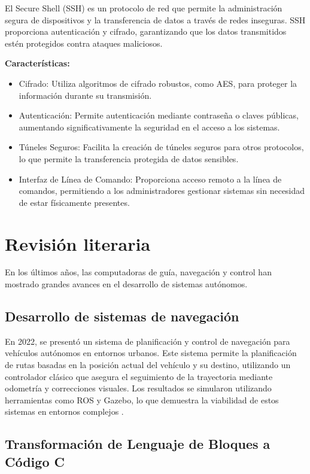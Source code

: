El Secure Shell (SSH) es un protocolo de red que permite la administración segura de dispositivos y la transferencia de datos a través de redes inseguras. SSH proporciona autenticación y cifrado, garantizando que los datos transmitidos estén protegidos contra ataques maliciosos.

\textbf{Características:}

\begin{itemize}
    \item Cifrado: Utiliza algoritmos de cifrado robustos, como AES, para proteger la información durante su transmisión.
    \item Autenticación: Permite autenticación mediante contraseña o claves públicas, aumentando significativamente la seguridad en el acceso a los sistemas.
    \item Túneles Seguros: Facilita la creación de túneles seguros para otros protocolos, lo que permite la transferencia protegida de datos sensibles.
    \item Interfaz de Línea de Comando: Proporciona acceso remoto a la línea de comandos, permitiendo a los administradores gestionar sistemas sin necesidad de estar físicamente presentes.
\end{itemize}

\section{Revisión literaria}
En los últimos años, las computadoras de guía, navegación y control han mostrado grandes avances en el desarrollo de sistemas autónomos.

\subsection{Desarrollo de sistemas de navegación}

En 2022, se presentó un sistema de planificación y control de navegación para vehículos autónomos en entornos urbanos. Este sistema permite la planificación 
de rutas basadas en la posición actual del vehículo y su destino, utilizando un controlador clásico que asegura el seguimiento de la trayectoria mediante 
odometría y correcciones visuales. Los resultados se simularon utilizando herramientas como ROS y Gazebo, lo que demuestra la viabilidad de estos sistemas en 
entornos complejos \cite{BarreraRamrez2022SistemaDP}. 

\subsection{Transformación de Lenguaje de Bloques a Código C}

